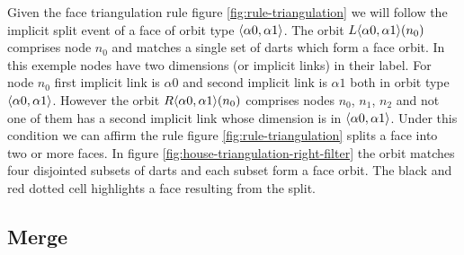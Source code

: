 \documentclass[times,twocolumn,final]{els-format/elsarticle}
\begin{document}
Given the face triangulation rule figure \ref{fig:rule-triangulation} we will
follow the implicit split event of a face of orbit type
$\langle\alpha 0, \alpha 1\rangle$. The orbit $L\langle\alpha 0, \alpha 1\rangle(n_{0})$
comprises node $n_{0}$ and matches a single set of darts which form a face
orbit. In this exemple nodes have two dimensions (or implicit links) in their
label. For node $n_{0}$ first implicit link is $\alpha 0$ and second implicit
link is $\alpha 1$ both in orbit type $\langle\alpha 0, \alpha 1\rangle$. However the
orbit $R\langle\alpha 0, \alpha 1\rangle(n_{0})$ comprises nodes $n_{0}$, $n_{1}$,
$n_{2}$ and not one of them has a second implicit link whose dimension is in
$\langle\alpha 0, \alpha 1\rangle$. Under this condition we can affirm the rule figure
\ref{fig:rule-triangulation} splits a face into two or more faces. In figure
\ref{fig:house-triangulation-right-filter} the orbit matches four disjointed
subsets of darts and each subset form a face orbit. The black and red dotted
cell highlights a face resulting from the split.



\subsection[Merge]{Merge}
\label{sec:merge}

\end{document}
